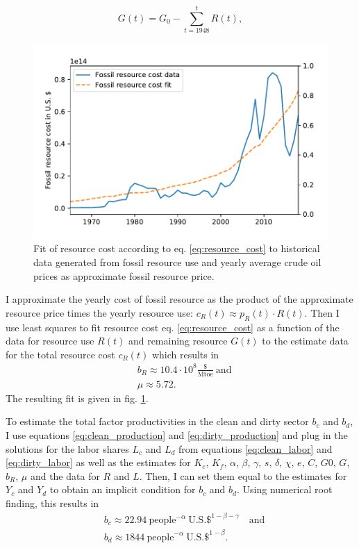 \begin{equation} 
  G(t) = G_0 - \sum_{t=1948}^{t}R(t),
  \label{eq:fossil_resource_time_series}
\end{equation}
\begin{figure}
	\vspace{-.4 cm}
        \hspace{-1 cm}
        \includegraphics[width = .68 \textwidth]{./figures/resource_price_fit.pdf}
        \caption{Fit of resource cost according to eq. \ref{eq:resource_cost} to historical data generated from fossil resource use and yearly average crude oil prices as approximate fossil resource price. \label{fig:resource_cost_fit}}
\end{figure}


I approximate the yearly cost of fossil resource as the product of the approximate resource price times the yearly resource use: $c_R(t) \approx p_R(t) \cdot R(t)$. Then I use least squares to fit resource cost eq. \ref{eq:resource_cost} as a function of the data for resource use $R(t)$ and remaining resource $G(t)$ to the estimate data for the total resource cost $c_R(t)$ which results in 
\begin{align}
  &b_R \approx 10.4 \cdot 10^{8} \frac{\$}{\mathrm{Mtoe}} ~ \mathrm{and}\\
  & \mu \approx 5.72.
  \label{eq:estimate_resource_cost}
\end{align}
The resulting fit is given in fig. \ref{fig:resource_cost_fit}.

To estimate the total factor productivities in the clean and dirty sector $b_c$ and $b_d$, I use equations \ref{eq:clean_production} and \ref{eq:dirty_production} and plug in the solutions for the labor shares $L_c$ and $L_d$ from equations \ref{eq:clean_labor} and \ref{eq:dirty_labor} as well as the estimates for $K_c$, $K_f$, $\alpha$, $\beta$, $\gamma$, $s$, $\delta$, $\chi$, $e$, $C$, $G0$, $G$, $b_R$, $\mu$ and the data for $R$ and $L$. Then, I can set them equal to the estimates for $Y_c$ and $Y_d$ to obtain an implicit condition for $b_c$ and $b_d$. Using numerical root finding, this results in 
 \begin{align}
  &b_c \approx 22.94 ~ \mathrm{people} ^{-\alpha} ~ \mathrm{U.S. \$}^{1-\beta-\gamma} \quad \mathrm{and} \\
  &b_d \approx 1844 ~ \mathrm{people}^{-\alpha} ~ \mathrm{U.S. \$}^{1-\beta}.
  \label{eq:estimate_total_factor_productivities}
\end{align}

